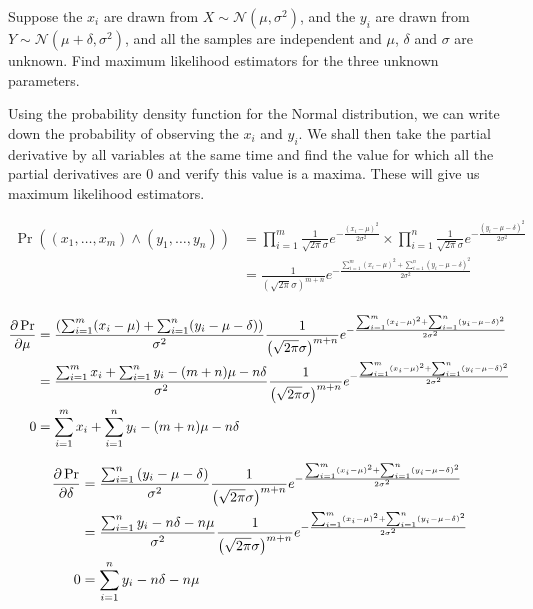 \documentclass[10pt,\jkfside,a4paper]{article}
\begin{document}
\begin{enumerate}
Suppose the $x_i$ are drawn from $X \sim \mathcal{N}(\mu, \sigma^2)$, and the
$y_i$ are drawn from $Y \sim \mathcal{N}(\mu + \delta, \sigma^2)$, and all
the samples are independent and $\mu$, $\delta$ and $\sigma$ are unknown.
Find maximum likelihood estimators for the three unknown parameters.

Using the probability density function for the Normal distribution, we can
write down the probability of observing the $x_i$ and $y_i$. We shall then
take the partial derivative by all variables at the same time and find the
value for which all the partial derivatives are 0 and verify this value is a
maxima. These will give us maximum likelihood estimators.

\[
\begin{split}
\Pr((x_1, \dots, x_m) \wedge (y_1, \dots, y_n)) &=
\prod^m_{i=1} \frac{1}{\sqrt{2\pi}\sigma}e^{-\frac{(x_i -\mu)^2}{2\sigma^2}}
\times \prod^n_{i=1} \frac{1}{\sqrt{2\pi}\sigma}e^{-\frac{(y_i -\mu -
\delta)^2}{2\sigma^2}} \\
&=
\frac{1}{\left(\sqrt{2\pi}\sigma\right)^{m + n}} e^{-\frac{\sum^m_{i=1}(x_i -
\mu)^2 + \sum^n_{i=1}(y_i - \mu - \delta)^2}{2\sigma^2}} \\
\end{split}
\]

\[
\begin{split}
\pdv{\Pr}{\mu} &= \frac{\left(\sum^m_{i=1}(x_i - \mu) + \sum^n_{i=1}(y_i -
\mu - \delta)\right)}{\sigma^2}\frac{1}{\left(\sqrt{2\pi}\sigma\right)
^{m + n}} e^{-\frac{\sum^m_{i=1}(x_i -\mu)^2 + \sum^n_{i=1}(y_i - \mu - \delta)
^2}{2\sigma^2}} \\
&= \frac{\sum^{m}_{i=1} x_i + \sum^{n}_{i=1} y_i - (m + n)\mu - n\delta}
{\sigma^2}\frac{1}{\left(\sqrt{2\pi}\sigma\right)^{m + n}}
e^{-\frac{\sum^m_{i=1}(x_i -\mu)^2 + \sum^n_{i=1}(y_i - \mu - \delta)
^2}{2\sigma^2}} \\
0 &= \sum^{m}_{i=1} x_i + \sum^{n}_{i=1} y_i - (m + n)\mu - n\delta \\
\end{split}
\]

\[
\begin{split}
\pdv{\Pr}{\delta} &= \frac{\sum^n_{i=1}\left(y_i - \mu - \delta \right)
}{\sigma^2}\frac{1}{\left(\sqrt{2\pi}\sigma\right)^{m + n}} e^{-\frac{
\sum^m_{i=1}(x_i - \mu)^2 + \sum^n_{i=1}(y_i - \mu - \delta)^2}{2\sigma^2}} \\
&= \frac{\sum^n_{i=1} y_i - n\delta - n\mu}{\sigma^2}
 \frac{1}{\left (\sqrt{2\pi}\sigma\right)^{m + n}} e^{-\frac{\sum^m_{i=1}(x_i -
\mu)^2 + \sum^n_{i=1}(y_i - \mu - \delta)^2}{2\sigma^2}} \\
0 &= \sum^n_{i=1} y_i - n\delta - n\mu\\
\end{split}
\]


\end{enumerate}
\end{document}

